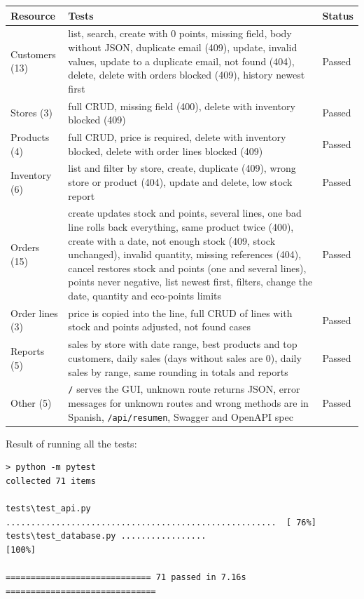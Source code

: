\documentclass[11pt]{article}
\renewcommand{\_}{\oldus\allowbreak}
\begin{document}
\begin{center}
\small
\begin{longtable}{>{\raggedright}p{2.6cm} >{\raggedright}p{10.6cm} p{1.3cm}}
\toprule
\textbf{Resource} & \textbf{Tests} & \textbf{Status} \\
\midrule
\endhead
Customers (13) & list, search, create with 0 points, missing field, body without JSON, duplicate email (409), update, invalid values, update to a duplicate email, not found (404), delete, delete with orders blocked (409), history newest first & Passed \\
Stores (3) & full CRUD, missing field (400), delete with inventory blocked (409) & Passed \\
Products (4) & full CRUD, price is required, delete with inventory blocked, delete with order lines blocked (409) & Passed \\
Inventory (6) & list and filter by store, create, duplicate (409), wrong store or product (404), update and delete, low stock report & Passed \\
Orders (15) & create updates stock and points, several lines, one bad line rolls back everything, same product twice (400), create with a date, not enough stock (409, stock unchanged), invalid quantity, missing references (404), cancel restores stock and points (one and several lines), points never negative, list newest first, filters, change the date, quantity and eco-points limits & Passed \\
Order lines (3) & price is copied into the line, full CRUD of lines with stock and points adjusted, not found cases & Passed \\
Reports (5) & sales by store with date range, best products and top customers, daily sales (days without sales are 0), daily sales by range, same rounding in totals and reports & Passed \\
Other (5) & \texttt{/} serves the GUI, unknown route returns JSON, error messages for unknown routes and wrong methods are in Spanish, \texttt{/api/resumen}, Swagger and OpenAPI spec & Passed \\
\bottomrule
\end{longtable}
\end{center}

Result of running all the tests:

\begin{lstlisting}
> python -m pytest
collected 71 items

tests\test_api.py ......................................................  [ 76%]
tests\test_database.py .................                                 [100%]

============================= 71 passed in 7.16s ==============================
\end{lstlisting}
\end{document}

